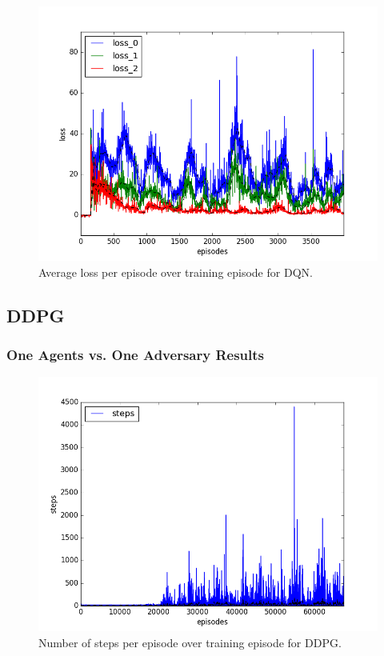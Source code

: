 \begin{figure}[h]
  \centering
  \includegraphics[trim=10 10 10 10,clip,width=\figscale\linewidth]
  {../results/dqn_2vs1/loss.png}
  \caption{Average loss per episode over training episode for DQN.}
  \label{fig:dqn-2vs1}
\end{figure}
\FloatBarrier


\subsection{DDPG}
\label{sec:experiment:ddpg}


\subsubsection{One Agents vs. One Adversary Results}
\label{sec:experiment:ddpg:1vs1}


\begin{figure}[h]
  \centering
  \includegraphics[trim=10 10 10 10,clip,width=\figscale\linewidth]
  {../results/ddpg_1vs1/steps.png}
  \caption{Number of steps per episode over training episode for DDPG.}
  \label{fig:ddpg-1vs1}
\end{figure}
\FloatBarrier


